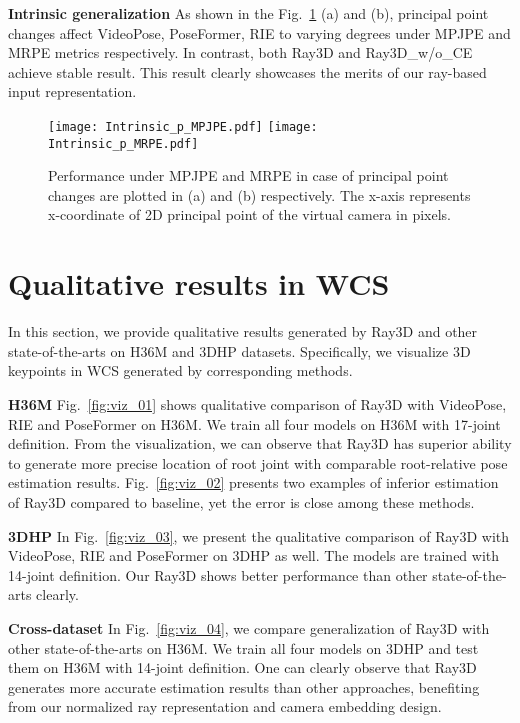 \documentclass[10pt,twocolumn,letterpaper]{article}
\begin{document}
\noindent\textbf{Intrinsic generalization}
As shown in the Fig.~\ref{fig:intrinsic_pp_supp} (a) and (b), principal point changes affect VideoPose, PoseFormer, RIE to varying degrees under MPJPE and MRPE metrics respectively. In contrast, both Ray3D and Ray3D\_w/o\_CE achieve stable result. This result clearly showcases the merits of our ray-based input representation. 
\begin{figure}
  \centering
  \texttt{[image: Intrinsic\_p\_MPJPE.pdf]}
  \texttt{[image: Intrinsic\_p\_MRPE.pdf]}
  \caption{Performance under MPJPE and MRPE in case of principal point changes are plotted in (a) and (b) respectively. The x-axis represents x-coordinate of 2D principal point of the virtual camera in pixels.}
  \label{fig:intrinsic_pp_supp}
\end{figure}


\section{Qualitative results in WCS}
In this section, we provide qualitative results generated by Ray3D and other state-of-the-arts on H36M and 3DHP datasets. Specifically, we visualize 3D keypoints in WCS generated by corresponding methods.

\noindent\textbf{H36M}
Fig.~\ref{fig:viz_01} shows qualitative comparison of Ray3D with VideoPose, RIE and PoseFormer on H36M. We train all four models on H36M with 17-joint definition. From the visualization, we can observe that Ray3D has superior ability to generate more precise location of root joint with comparable root-relative pose estimation results. Fig.~\ref{fig:viz_02} presents two examples of inferior estimation of Ray3D compared to baseline, yet the error is close among these methods. 

\noindent\textbf{3DHP}
In Fig.~\ref{fig:viz_03}, we present the qualitative comparison of Ray3D with VideoPose, RIE and PoseFormer on 3DHP as well. The models are trained with 14-joint definition. Our Ray3D shows better performance than other state-of-the-arts clearly.

\noindent\textbf{Cross-dataset}
In Fig.~\ref{fig:viz_04}, we compare generalization of Ray3D with other state-of-the-arts on H36M. We train all four models on 3DHP and test them on H36M with 14-joint definition. One can clearly observe that Ray3D generates more accurate estimation results than other approaches, benefiting from our normalized ray representation and camera embedding design.
\end{document}
